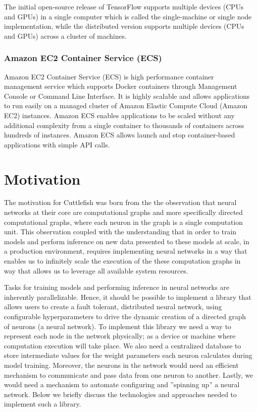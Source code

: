 \documentclass[conference]{IEEEtran}
\begin{document}
The initial open-source release of TensorFlow supports multiple devices (CPUs and GPUs) in a single computer which is called the single-machine or single node implementation, while the distributed version supports multiple devices (CPUs and GPUs) across a cluster of machines.

\subsubsection{Amazon EC2 Container Service (ECS)}
Amazon EC2 Container Service (ECS) is high performance container management service which supports Docker containers through Management Console or Command Line Interface. It is highly scalable and allows applications to run easily on a managed cluster of Amazon Elastic Compute Cloud (Amazon EC2) instances. Amazon ECS enables applications to be scaled without any additional complexity from a single container to thousands of containers across hundreds of instances. Amazon ECS allows launch and stop container-based applications with simple API calls. 

\section{Motivation}
The motivation for Cuttlefish was born from the the observation that neural networks at their core are computational graphs and more specifically directed computational graphs, where each neuron in the graph is a single computation unit. This observation coupled with the understanding that in order to train models and perform inference on new data presented to these models at scale, in a production environment, requires implementing neural networks in a way that enables us to infinitely scale the execution of the these computation graphs in way that allows us to leverage all available system resources.  

Tasks for training models and performing inference in neural networks are inherently parallelizable. Hence, it should be possible to implement a library that allows users to create a fault tolerant, distributed neural network, using configurable hyperparameters to drive the dynamic creation of a directed graph of neurons (a neural network).  To implement this library we need a way to represent each node in the network physically; as a device or machine where computation execution will take place. We also need a centralized database to store intermediate values for the weight parameters each neuron calculates during model training. Moreover, the neurons in the network would need an efficient mechanism to communicate and pass data from one neuron to another. Lastly, we would need a mechanism to automate configuring and ''spinning up'' a neural network.  Below we briefly discuss the technologies and approaches needed to implement such a library.
\end{document}
